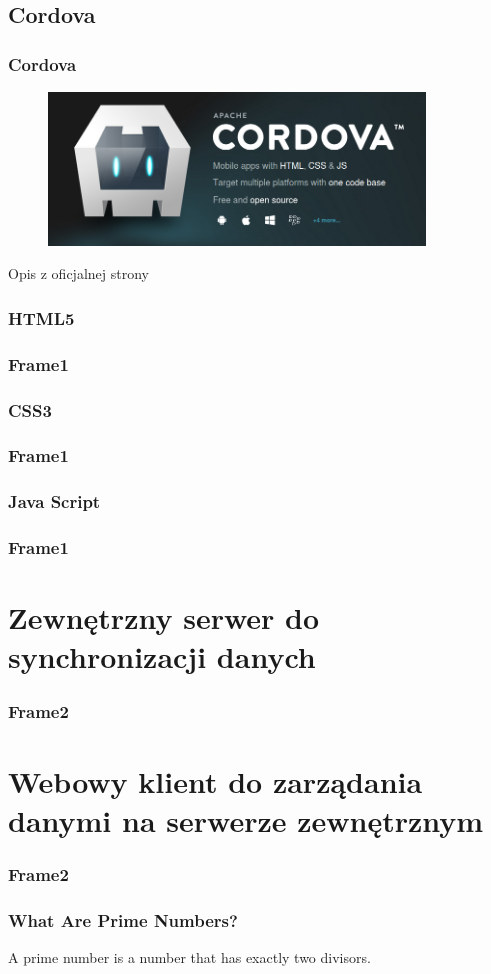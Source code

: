 \documentclass{beamer}
\begin{document}
\subsection{Cordova}

\begin{frame}
\frametitle{Cordova}
\begin{figure}
 \includegraphics[width=10cm,valign=t]{cordova.png}
 \end{figure}
 \begin{block}{Opis z oficjalnej strony }

 \end{block}
\end{frame}
\subsubsection{HTML5}
\begin{frame}
\frametitle{Frame1}
\end{frame}
\subsubsection{CSS3}
\begin{frame}
\frametitle{Frame1}
\end{frame}
\subsubsection{Java Script}
\begin{frame}
\frametitle{Frame1}
\end{frame}
\section{Zewnętrzny serwer do synchronizacji danych}
\begin{frame}
\frametitle{Frame2}
\end{frame}
\section{Webowy klient do zarządania danymi na serwerze zewnętrznym}
\begin{frame}
\frametitle{Frame2}
\end{frame}
\begin{frame}
\frametitle{What Are Prime Numbers?}
\begin{definition}
A \alert{prime number} is a number that has exactly two divisors.
\end{definition}
\end{frame}
\end{document}
